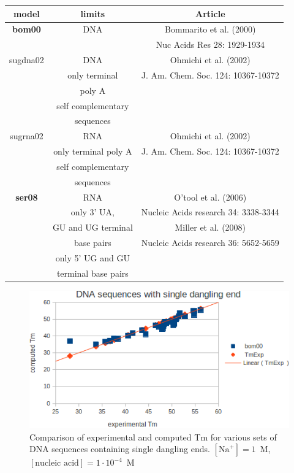 \documentclass{article}
\begin{document}
\begin{table}[hc]
\begin{tabular}[h]{| c | c | c |}
\textbf{model} & \textbf{limits} & \textbf{Article} \\
\hline
\textbf{bom00} & DNA & Bommarito et al. (2000) \\
 & & Nuc Acids Res 28: 1929-1934 \\
\hline
sugdna02 & DNA & Ohmichi et al. (2002) \\
 & only terminal & J. Am. Chem. Soc. 124: 10367-10372 \\
 & poly A & \\
 & self complementary & \\
 & sequences & \\
 \hline
sugrna02 & RNA & Ohmichi et al. (2002) \\
 & only terminal poly A & J. Am. Chem. Soc. 124: 10367-10372 \\
 & self complementary & \\
 & sequences & \\
 \hline
\textbf{ser08} & RNA & O'tool et al. (2006) \\
 & only 3' UA, & Nucleic Acids research 34: 3338-3344 \\
 & GU and UG terminal & Miller et al. (2008) \\
 & base pairs & Nucleic Acids research 36: 5652-5659 \\
 & only 5' UG and GU & \\
 & terminal base pairs & \\
 \hline
\end{tabular}
\end{table}

\begin{figure}[h]
\includegraphics[width=1\linewidth]{images/DNASingleDanglingEnd}
\caption{Comparison of experimental and computed Tm for various sets of
 DNA sequences containing single dangling ends. $[\mbox{Na}^+] = 1$~M, $[\mbox{nucleic acid}] = 1\cdot{}10^{-4}$~M}
\end{figure}
\end{document}
